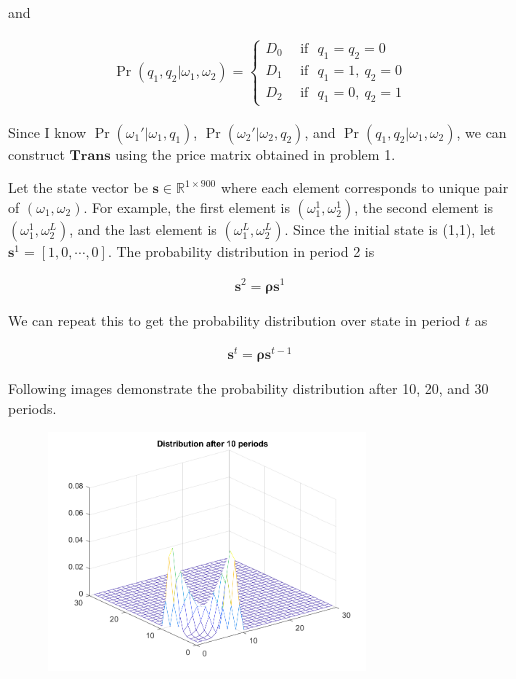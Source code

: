 \documentclass[11pt,letter]{article}
\newcommand{\vect}[1]{\boldsymbol{\mathbf{#1}}}
\newcounter{lem}[section] \setcounter{lem}{0}
\begin{document}
and 

\begin{align*}
\Pr(q_1,q_2 |\omega_1,\omega_2) = 
\begin{cases}
D_0 \ \ &\text{if} \ \ \ q_1=q_2=0\\
D_1 \ \ &\text{if} \ \ \ q_1=1,\ q_2=0 \\
D_2 \ \ &\text{if} \ \ \ q_1=0,\ q_2=1
\end{cases}
\end{align*}

Since I know $\Pr(\omega_1' |\omega_1,q_1)$, $\Pr(\omega_2' |\omega_2,q_2)$, and $\Pr(q_1,q_2 |\omega_1,\omega_2)$, we can construct $\vect{Trans}$ using the price matrix obtained in problem 1.

Let the state vector be $\vect{s}\in\mathbb{R}^{1\times900}$  where each element corresponds to unique pair of $(\omega_1,\omega_2)$. For example, the first element is $(\omega_1^1,\omega_2^1)$, the second element is  $(\omega_1^1,\omega_2^L)$, and the last element is  $(\omega_1^L,\omega_2^L)$. Since the initial state is (1,1), let $\vect{s}^1 = [1,0,\cdots,0]$. The probability distribution in period 2 is

\begin{align*}
\vect{s}^2 = \vect{\rho}\vect{s}^1
\end{align*}

We can repeat this to get the probability distribution over state in period $t$ as

\begin{align*}
\vect{s}^t =\vect{\rho} \vect{s}^{t-1}
\end{align*}

Following images demonstrate the probability distribution after 10, 20, and 30 periods.


\begin{figure}[h]
\begin{center}
\includegraphics[width=0.75\textwidth]{10period.png}
\end{center}
\end{figure}
\end{document}
